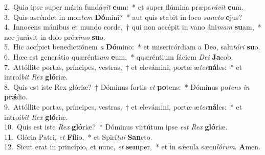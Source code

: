 {2.~}Quia ipse super mária fundá\textit{vit} \textbf{e}um:~* et super flúmina præpa\textit{rá}\textit{vit} \textbf{e}um.\\
{3.~}Quis ascéndet in mon\textit{tem} \textbf{Dó}mini?~* aut quis stabit in loco \textit{san}\textit{cto} \textbf{e}jus?\\
{4.~}Innocens mánibus et mundo corde,~† qui non accépit in vano áni\textit{mam} \textbf{su}am,~* nec jurávit in dolo pró\textit{xi}\textit{mo} \textbf{su}o.\\
{5.~}Hic accípiet benedictiónem \textit{a} \textbf{Dó}mino:~* et misericórdiam a Deo, salu\textit{tá}\textit{ri} \textbf{su}o.\\
{6.~}Hæc est generátio quærénti\textit{um} \textbf{e}um,~* quæréntium fáciem \textit{De}\textit{i} \textbf{Ja}cob.\\
{7.~}Attóllite portas, príncipes, vestras,~† et elevámini, portæ æ\textit{ter}\textbf{ná}les:~* et introí\textit{bit} \textit{Rex} \textbf{gló}riæ.\\
{8.~}Quis est iste Rex glóriæ?~† Dóminus fortis \textit{et} \textbf{po}tens:~* Dóminus po\textit{tens} \textit{in} \textbf{prǽ}lio.\\
{9.~}Attóllite portas, príncipes, vestras,~† et elevámini, portæ æ\textit{ter}\textbf{ná}les:~* et introí\textit{bit} \textit{Rex} \textbf{gló}riæ.\\
{10.~}Quis est iste \textit{Rex} \textbf{gló}riæ?~* Dóminus virtútum ipse \textit{est} \textit{Rex} \textbf{gló}riæ.\\
{11.~}Glória Patri, \textit{et} \textbf{Fí}lio,~* et Spirí\textit{tu}\textit{i} \textbf{San}cto.\\
{12.~}Sicut erat in princípio, et nunc, \textit{et} \textbf{sem}per,~* et in sǽcula sæcu\textit{ló}\textit{rum}. \textbf{A}men.\\
